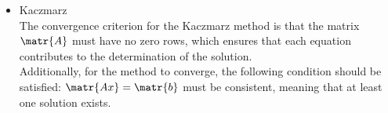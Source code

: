 \begin{itemize}
\begin{enumerate}
      \item Find the eigenvalues of $\matr{A}^T\matr{A}$, denoted $\lambda_i$.
      
      \item Identify the maximum eigenvalue:
      \begin{equation*}
        \lambda_{max} = \max(\lambda_i)
      \end{equation*}
      
      \item Calculate the upper bound for \( \alpha \):
      \begin{equation*}
        \alpha < \frac{2}{\lambda_{max}}
      \end{equation*}
  \end{enumerate}

  Computed result using MATLAB gives us $\lambda_{max} \approx 13.0902$ giving us resulting convergence criterion range as:
  \begin{equation*}
    0 < \alpha < 0.1528
  \end{equation*}

  Choosing \( \alpha \) within this range ensures that the Landweber iterations will converge.

  \item Kaczmarz \\
  
    The convergence criterion for the Kaczmarz method is that the matrix $ \matr{A} $ must have no zero rows, 
    which ensures that each equation contributes to the determination of the solution. \\
    Additionally, for the method to converge, the following condition should be satisfied: 
    $ \matr{Ax} = \matr{b} $ must be consistent, meaning that at least one solution exists.
\end{itemize}
